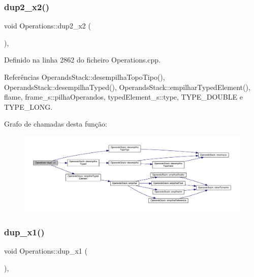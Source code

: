 \subsubsection{\texorpdfstring{dup2\+\_\+x2()}{dup2\_x2()}}
{\footnotesize\ttfamily void Operations\+::dup2\+\_\+x2 (\begin{DoxyParamCaption}{ }\end{DoxyParamCaption})\hspace{0.3cm}{\ttfamily [static]}, {\ttfamily [private]}}



Definido na linha 2862 do ficheiro Operations.\+cpp.



Referências Operands\+Stack\+::desempilha\+Topo\+Tipo(), Operands\+Stack\+::desempilha\+Typed(), Operands\+Stack\+::empilhar\+Typed\+Element(), flame, frame\+\_\+s\+::pilha\+Operandos, typed\+Element\+\_\+s\+::type, T\+Y\+P\+E\+\_\+\+D\+O\+U\+B\+LE e T\+Y\+P\+E\+\_\+\+L\+O\+NG.

Grafo de chamadas desta função\+:
\nopagebreak
\begin{figure}[H]
\begin{center}
\leavevmode
\includegraphics[width=350pt]{classOperations_ab49247b3958376b27e8347e053dfe7de_cgraph}
\end{center}
\end{figure}
\mbox{\label{classOperations_a46bab81a4a4bd1eda1c89b0b74f9e014}} 
\subsubsection{\texorpdfstring{dup\+\_\+x1()}{dup\_x1()}}
{\footnotesize\ttfamily void Operations\+::dup\+\_\+x1 (\begin{DoxyParamCaption}{ }\end{DoxyParamCaption})\hspace{0.3cm}{\ttfamily [static]}, {\ttfamily [private]}}




